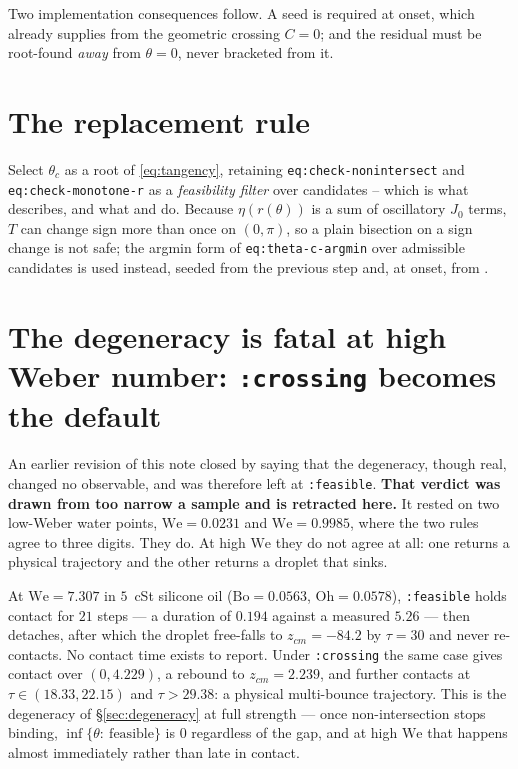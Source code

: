 \documentclass[11pt]{article}
\newcommand{\Oh}{\mathrm{Oh}}
\newcommand{\We}{\mathrm{We}}
\newcommand{\Bo}{\mathrm{Bo}}
\begin{document}
Two implementation consequences follow. A seed is required at onset, which
 already supplies from the geometric crossing $C=0$; and the residual must be
root-found \emph{away} from $\theta=0$, never bracketed from it.

\section{The replacement rule}

Select $\theta_c$ as a root of \eqref{eq:tangency}, retaining
\texttt{eq:check-nonintersect} and \texttt{eq:check-monotone-r} as a \emph{feasibility filter} over
candidates -- which is what  describes, and what
\cite{AlventosaEtAl2023} and \cite{GaleanoRios2017} do. Because $\eta(r(\theta))$ is a sum of
oscillatory $J_0$ terms, $T$ can change sign more than once on $(0,\pi)$, so a plain bisection on
a sign change is not safe; the argmin form of \texttt{eq:theta-c-argmin} over admissible candidates
is used instead, seeded from the previous step and, at onset, from .

\section{The degeneracy is fatal at high Weber number: \texttt{:crossing} becomes the default}
\label{sec:crossing-default}

An earlier revision of this note closed by saying that the degeneracy, though real, changed no
observable, and  was therefore left at \texttt{:feasible}. \textbf{That
verdict was drawn from too narrow a sample and is retracted here.} It rested on two low-Weber water
points, $\We=0.0231$ and $\We=0.9985$, where the two rules agree to three digits. They do. At high
$\We$ they do not agree at all: one returns a physical trajectory and the other returns a droplet
that sinks.

At $\We=7.307$ in $5$~cSt silicone oil ($\Bo=0.0563$, $\Oh=0.0578$), \texttt{:feasible} holds
contact for $21$ steps --- a duration of $0.194$ against a measured $5.26$ --- then detaches, after
which the droplet free-falls to $z_{cm}=-84.2$ by $\tau=30$ and never re-contacts. No contact time
exists to report. Under \texttt{:crossing} the same case gives contact over $(0,4.229)$, a rebound
to $z_{cm}=2.239$, and further contacts at $\tau\in(18.33,22.15)$ and $\tau>29.38$: a physical
multi-bounce trajectory. This is the degeneracy of \S\ref{sec:degeneracy} at full strength --- once
non-intersection stops binding, $\inf\{\theta:\ \text{feasible}\}$ is $0$ regardless of the gap, and
at high $\We$ that happens almost immediately rather than late in contact.
\end{document}
